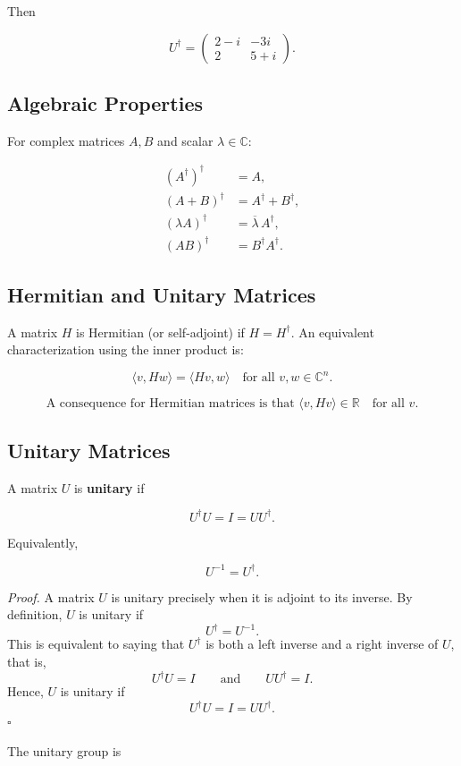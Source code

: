 \documentclass{article}
\theoremstyle{definition}
\begin{document}
Then

\[
U^\dagger =
\begin{pmatrix}
2 - i & -3i \\
2 & 5 + i
\end{pmatrix}.
\]

\subsection*{Algebraic Properties}

For complex matrices $A,B$ and scalar $\lambda \in \mathbb{C}$:

\begin{align*}
(A^\dagger)^\dagger &= A, \\
(A+B)^\dagger &= A^\dagger + B^\dagger, \\
(\lambda A)^\dagger &= \overline{\lambda}\, A^\dagger, \\
(AB)^\dagger &= B^\dagger A^\dagger.
\end{align*}
\subsection{Hermitian and Unitary Matrices}
A matrix \(H\) is Hermitian (or self-adjoint) if \(H = H^\dagger\).
An equivalent characterization using the inner product is:

\[
\langle v, Hw\rangle = \langle Hv, w\rangle
\quad \text{for all } v,w \in \mathbb{C}^n.
\]

\[
\text{A consequence for Hermitian matrices is that }
\langle v, Hv\rangle \in \mathbb{R}
\quad \text{for all } v.
\]
\subsection*{Unitary Matrices}

A matrix $U$ is \textbf{unitary} if

\[
U^\dagger U = I = U U^\dagger.
\]

Equivalently,

\[
U^{-1} = U^\dagger.
\]

\textit{Proof.}
A matrix $U$ is unitary precisely when it is adjoint to its inverse. By definition, $U$ is unitary if
\[
U^\dagger = U^{-1}.
\]
This is equivalent to saying that $U^\dagger$ is both a left inverse and a right inverse of $U$, that is,
\[
U^\dagger U = I
\qquad \text{and} \qquad
UU^\dagger = I.
\]
Hence, $U$ is unitary if
\[
U^\dagger U = I = UU^\dagger.
\]
\hfill $\square$

The unitary group is
\end{document}
